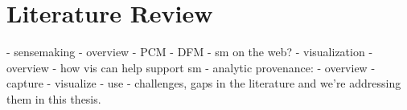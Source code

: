 \chapter{Literature Review}

\graphicspath{{Chapter2/figures/}}

- sensemaking
 - overview
 - PCM
 - DFM
 - sm on the web?
- visualization
 - overview
 - how vis can help support sm 
- analytic provenance:
 - overview
 - capture
 - visualize
 - use
- challenges, gaps in the literature and we're addressing them in this thesis.


%
%

%
